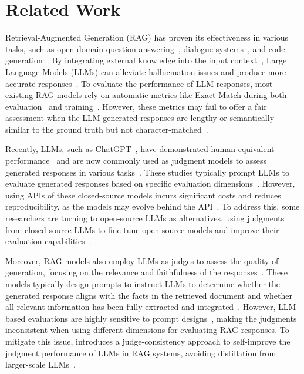 \section{Related Work}
Retrieval-Augmented Generation (RAG) has proven its effectiveness in various tasks, such as open-domain question answering~\cite{trivedi2023interleaving}, dialogue systems~\cite{cai2019skeleton}, and code generation~\cite{li2025building}. By integrating external knowledge into the input context~\cite{Ram2023Incontextlearning}, Large Language Models (LLMs) can alleviate hallucination issues and produce more accurate responses~\cite{RALM2024Asai}. To evaluate the performance of LLM responses, most existing RAG models rely on automatic metrics like Exact-Match during both evaluation~\cite{Radit2023Lin,Retrieval2023Gao} and training~\cite{rag-ddr2024Li}. However, these metrics may fail to offer a fair assessment when the LLM-generated responses are lengthy or semantically similar to the ground truth but not character-matched~\cite{EnablingLargeLanguageModelstoGenerateTextwithCitations2023GaoTianyu}.

Recently, LLMs, such as ChatGPT~\cite{openai2023gpt}, have demonstrated human-equivalent performance~\cite{chiang2023can,zheng2023judging,sottana2023evaluation} and are now commonly used as judgment models to assess generated responses in various tasks~\cite{chen2023huatuogpt,chen2023teaching,an2023eval,chanchateval}. These studies typically prompt LLMs to evaluate generated responses based on specific evaluation dimensions~\cite{chiang2023closer}. However, using APIs of these closed-source models incurs significant costs and reduces reproducibility, as the models may evolve behind the API~\cite{SurveyonLLM-as-a-Judge2024Gu}. To address this, some researchers are turning to open-source LLMs as alternatives, using judgments from closed-source LLMs to fine-tune open-source models and improve their evaluation capabilities~\cite{wangpandalm,zheng2023judging}.

Moreover, RAG models also employ LLMs as judges to assess the quality of generation, focusing on the relevance and faithfulness of the responses~\cite{saad2024ares,friel2024ragbench,adlakha2023evaluating}. These models typically design prompts to instruct LLMs to determine whether the generated response aligns with the facts in the retrieved document and whether all relevant information has been fully extracted and integrated~\cite{jin2024rag,jacovi2025facts,Rageval2024Zhu}. However, LLM-based evaluations are highly sensitive to prompt designs~\cite{zhou2023survival,liu2024aligning}, making the judgments inconsistent when using different dimensions for evaluating RAG responses. To mitigate this issue, \method{} introduces a judge-consistency approach to self-improve the judgment performance of LLMs in RAG systems, avoiding distillation from larger-scale LLMs~\cite{zhang2025rag}.










